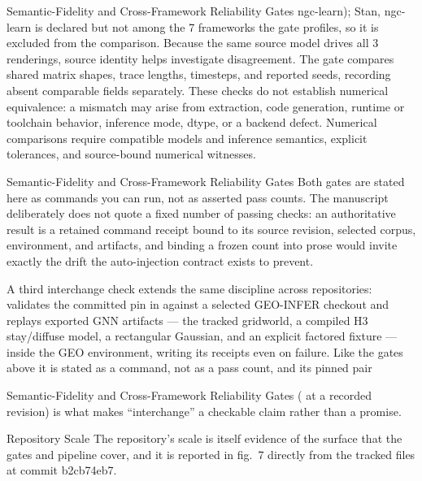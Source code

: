 \documentclass[
  ignorenonframetext,
]{beamer}
\begin{document}
\begin{frame}{Semantic-Fidelity and
Cross-Framework Reliability Gates}
ngc-learn); Stan, ngc-learn is declared but not among the 7 frameworks
the gate profiles, so it is excluded from the comparison. Because the
same source model drives all 3 renderings, source identity helps
investigate disagreement. The gate compares shared matrix shapes, trace
lengths, timesteps, and reported seeds, recording absent comparable
fields separately. These checks do not establish numerical equivalence:
a mismatch may arise from extraction, code generation, runtime or
toolchain behavior, inference mode, dtype, or a backend defect.
Numerical comparisons require compatible models and inference semantics,
explicit tolerances, and source-bound numerical witnesses.

\end{frame}

\begin{frame}{Semantic-Fidelity and
Cross-Framework Reliability Gates}
Both gates are stated here as commands you can run, not as asserted pass
counts. The manuscript deliberately does not quote a fixed number of
passing checks: an authoritative result is a retained command receipt
bound to its source revision, selected corpus, environment, and
artifacts, and binding a frozen count into prose would invite exactly
the drift the auto-injection contract exists to prevent.

A third interchange check extends the same discipline across
repositories: 
validates the committed pin in  against a
selected GEO-INFER checkout and replays exported GNN artifacts --- the
tracked gridworld, a compiled H3 stay/diffuse model, a rectangular
Gaussian, and an explicit factored fixture --- inside the GEO
environment, writing its receipts even on failure. Like the gates above
it is stated as a command, not as a pass count, and its pinned pair
\end{frame}

\begin{frame}{Semantic-Fidelity and
Cross-Framework Reliability Gates}
( at a recorded revision) is
what makes ``interchange'' a checkable claim rather than a promise.
\end{frame}

\begin{frame}{Repository Scale}
\protect{}\label{repository-scale}
The repository's scale is itself evidence of the surface that the gates
and pipeline cover, and it is reported in fig.~7
directly from the tracked files at commit b2cb74eb7.

\end{frame}
\end{document}
